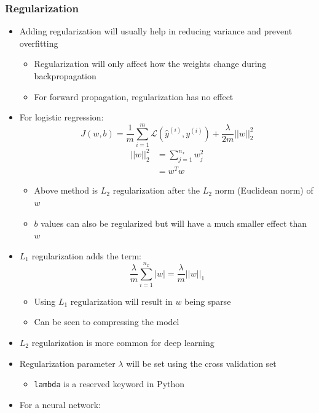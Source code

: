 \documentclass[12pt, letterpaper]{article}
\begin{document}
    \subsubsection{Regularization}
    \begin{itemize}
        \item Adding regularization will usually help in reducing variance and prevent overfitting
        \begin{itemize}
            \item Regularization will only affect how the weights change during backpropagation
            \item For forward propagation, regularization has no effect
        \end{itemize}
        \item For logistic regression:
        $$J(w,b)=\frac{1}{m}\sum_{i=1}^m\mathcal{L}(\hat{y}^{(i)}, y^{(i)})+\frac{\lambda}{2m}||w||_2^2$$
        \begin{align*}
            ||w||_2^2&=\sum_{j=1}^{n_x}w_j^2 \\
            &=w^Tw
        \end{align*}
        \begin{itemize}
            \item Above method is $L_2$ regularization after the $L_2$ norm (Euclidean norm) of $w$
            \item $b$ values can also be regularized but will have a much smaller effect than $w$ 
        \end{itemize}
        \item $L_1$ regularization adds the term:
        $$\frac{\lambda}{m}\sum_{i=1}^{n_x}|w|=\frac{\lambda}{m}||w||_1$$
        \begin{itemize}
            \item Using $L_1$ regularization will result in $w$ being sparse
            \item Can be seen to compressing the model
        \end{itemize}
        \item $L_2$ regularization is more common for deep learning 
        \item Regularization parameter $\lambda$ will be set using the cross validation set
        \begin{itemize}
            \item \texttt{lambda} is a reserved keyword in Python 
        \end{itemize}
        \item For a neural network:

\end{itemize}
\end{document}
